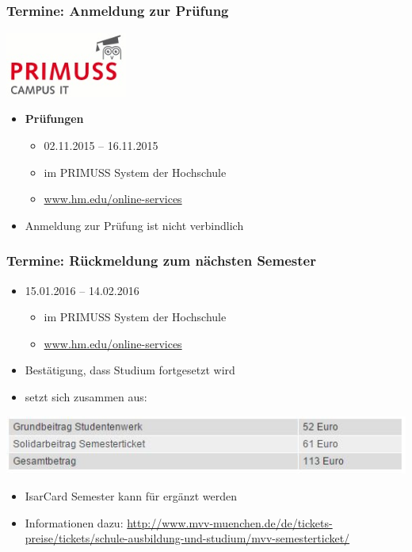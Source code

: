 \documentclass{beamer}
\begin{document}
    \begin{frame}
    	\frametitle{Termine: Anmeldung zur Prüfung}
    	\flushright
    	\includegraphics[width=0.3\textwidth]{primuss.jpg}
    	\begin{itemize}
    		\item \textbf{Prüfungen}
    		\begin{itemize}
    			\item 02.11.2015 – 16.11.2015
    			\item im PRIMUSS System der Hochschule
    			\item \url{www.hm.edu/online-services}
    		\end{itemize}
    		\item Anmeldung zur Prüfung ist nicht verbindlich
    	\end{itemize}
    \end{frame}
    
    \begin{frame}
    	\frametitle{Termine: Rückmeldung zum nächsten Semester}
    	\begin{itemize}
    		\item 15.01.2016 – 14.02.2016
    		\begin{itemize}
    			\item im PRIMUSS System der Hochschule
    			\item \url{www.hm.edu/online-services}
    		\end{itemize}
    		\pause
    		\item Bestätigung, dass Studium fortgesetzt wird
    		\pause
    		\item setzt sich zusammen aus:
    	\end{itemize}
    	\includegraphics[width=1\textwidth]{rueckmeldung.jpg}
    	\pause
    	\begin{itemize}
    		\item IsarCard Semester kann für  ergänzt werden
    		\item Informationen dazu: \footnotesize{\url{http://www.mvv-muenchen.de/de/tickets-preise/tickets/schule-ausbildung-und-studium/mvv-semesterticket/}}
    	\end{itemize}
    \end{frame}
    
\end{document}
